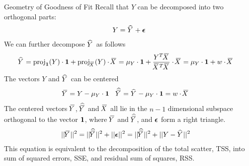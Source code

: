 \begin{frame}{Geometry of Goodness of Fit}
%
Recall that $Y$ can be decomposed into two orthogonal parts: %
\begin{align*}
    Y = \hY + \bepsilon
\end{align*}
We can further decompose $\hY$ as follows
\begin{align*}
    \hY & = \proj_\bone(Y) \cdot \bone + \proj_{\mX}(Y) \cdot \mX
     = \mu_Y \cdot \bone + \frac{Y^T \mX}{\mX^T \mX} \cdot \mX
     = \mu_Y \cdot \bone + w \cdot \mX
\end{align*}
The vectors $Y$ and $\hY$ can be centered%
\begin{align*}
    \mY & = Y - \mu_Y \cdot \bone &
    \hmY & = \hY - \mu_Y \cdot \bone = w \cdot \mX
\end{align*}
The centered vectors $\mY$, $\hmY$ and $\mX$ all lie in the $n-1$
dimensional subspace orthogonal to the vector $\bone$, where %
$\mY$ and $\hmY$, and %
$\bepsilon$ 
form a right triangle.%
\begin{align*}
    ||{\mY}||^2 & = ||{\hmY}||^2 + ||{\bepsilon}||^2
    = ||{\hmY}||^2 + ||{Y-\hY}||^2
\end{align*}
This equation is 
equivalent to the decomposition of the total scatter,
TSS, 
into sum of squared errors, SSE, and residual sum of squares, RSS. 

\end{frame}

